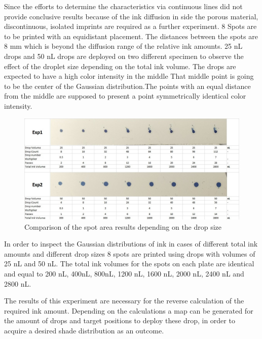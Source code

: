 Since the efforts to determine the characteristics via continuous lines did not provide conclusive results because of the ink diffusion in side the porous material, discontinuous, isolated imprints are required as a further experiment. 8 Spots are to be printed with an equidistant placement. The distances between the spots are 8 mm which is beyond the diffusion range of the relative ink amounts. 25 nL drops and 50 nL drops are deployed on two different specimen to observe the effect of the droplet size depending on the total ink volume. 
The drops are expected to have a high color intensity in the middle That middle point is going to be the center of the Gaussian distribution.The points with an equal distance from the middle are supposed to present a point symmetrically identical color intensity.

\bigskip

\begin{figure}[H]
	\centering
	\includegraphics[width=1\textwidth]{grafiken/psfprint.jpg}
	\caption{Comparison of the spot area results depending on the drop size}
	\label{fig:psfprint}
\end{figure} 

\bigskip

In order to inspect the Gaussian distributions of ink in cases of different total ink amounts and different drop sizes 8 spots are printed using drops with volumes of 25 nL and 50 nL. The total ink volumes for the spots on each plate are identical and equal to 200 nL, 400nL, 800nL, 1200 nL, 1600 nL, 2000 nL, 2400 nL and 2800 nL.

The results of this experiment are necessary for the reverse calculation of the required ink amount. Depending on the calculations a map can be generated for the amount of drops and target positions to deploy these drop, in order to acquire a desired shade distribution as an outcome.  


\bigskip

